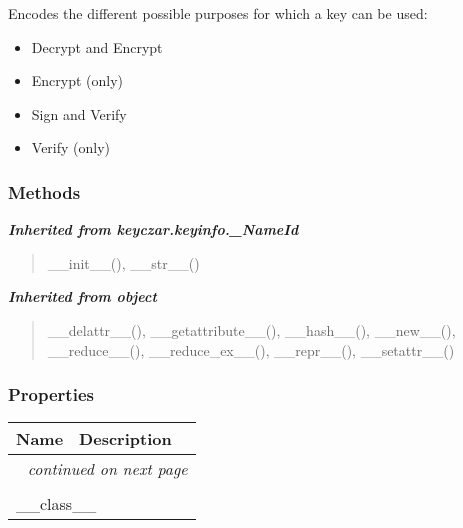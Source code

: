 Encodes the different possible purposes for which a key can be used:

\begin{itemize}
\setlength{\parskip}{0.6ex}
  \item Decrypt and Encrypt

  \item Encrypt (only)

  \item Sign and Verify

  \item Verify (only)

\end{itemize}



  \subsubsection{Methods}


\large{\textbf{\textit{Inherited from keyczar.keyinfo.\_NameId}}}

\begin{quote}
\_\_init\_\_(), \_\_str\_\_()
\end{quote}

\large{\textbf{\textit{Inherited from object}}}

\begin{quote}
\_\_delattr\_\_(), \_\_getattribute\_\_(), \_\_hash\_\_(), \_\_new\_\_(), \_\_reduce\_\_(), \_\_reduce\_ex\_\_(), \_\_repr\_\_(), \_\_setattr\_\_()
\end{quote}


  \subsubsection{Properties}

    \vspace{-1cm}
\hspace{\varindent}\begin{longtable}{|p{\varnamewidth}|p{\vardescrwidth}|l}
\cline{1-2}
\cline{1-2} \centering \textbf{Name} & \centering \textbf{Description}& \\
\cline{1-2}
\endhead\cline{1-2}\multicolumn{3}{r}{\small\textit{continued on next page}}\\\endfoot\cline{1-2}
\endlastfoot\multicolumn{2}{|l|}{\textit{Inherited from object}}\\
\multicolumn{2}{|p{\varwidth}|}{\raggedright \_\_class\_\_}\\
\cline{1-2}
\end{longtable}

